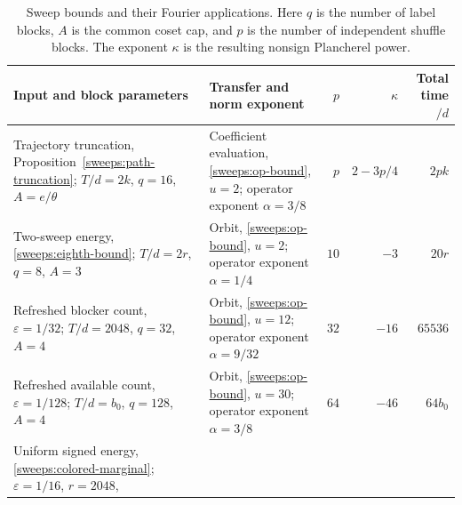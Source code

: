 \documentclass{article}
\begin{document}
\begingroup
\small
\setlength{\tabcolsep}{4pt}
\renewcommand{\arraystretch}{1.2}
\begin{longtable}{@{}p{.33\linewidth}p{.29\linewidth}r r r@{}}
\caption{Sweep bounds and their Fourier applications. Here $q$ is the
number of label blocks, $A$ is the common coset cap, and $p$ is the
number of independent shuffle blocks. The exponent $\kappa$ is the
resulting nonsign Plancherel power.}\label{sweeps:transfer-table}\\
\toprule
Input and block parameters & Transfer and norm exponent
 & $p$ & $\kappa$ & Total time$/d$\\
\midrule
\endfirsthead
\bottomrule
\endfoot
{}\label{sweeps:assembly-trajectory}
Trajectory truncation,\newline
Proposition~\ref{sweeps:path-truncation};\newline
$T/d=2k$, $q=16$, $A=e/\theta$
&
Coefficient evaluation,\newline
\eqref{sweeps:op-bound}, $u=2$;\newline
operator exponent $\alpha=3/8$
& $p$ & $2-3p/4$ & $2pk$\\
\label{sweeps:assembly-eight-orbits}
Two-sweep energy, \eqref{sweeps:eighth-bound};\newline
$T/d=2r$, $q=8$, $A=3$
&
Orbit, \eqref{sweeps:op-bound}, $u=2$;\newline
operator exponent $\alpha=1/4$
& $10$ & $-3$ & $20r$\\
\label{sweeps:assembly-blocker-orbits}
Refreshed blocker count,\newline
$\varepsilon=1/32$;\newline
$T/d=2048$, $q=32$, $A=4$
&
Orbit, \eqref{sweeps:op-bound}, $u=12$;\newline
operator exponent $\alpha=9/32$
& $32$ & $-16$ & $65536$\\
\label{sweeps:assembly-hole-orbits}
Refreshed available count,\newline
$\varepsilon=1/128$;\newline
$T/d=b_0$, $q=128$, $A=4$
&
Orbit, \eqref{sweeps:op-bound}, $u=30$;\newline
operator exponent $\alpha=3/8$
& $64$ & $-46$ & $64b_0$\\
\label{sweeps:assembly-colored-HS}
Uniform signed energy,\newline
\eqref{sweeps:colored-marginal};\newline
$\varepsilon=1/16$, $r=2048$,\newline

\end{longtable}
\end{document}
